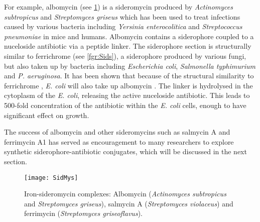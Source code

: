 For example, albomycin  (see \ref{fgr:SidMys}) is a sideromycin produced by \textit{Actinomyces subtropicus} and \textit{Streptomyces griseus}\cite{Hartmann1979,Fiedler1985} which has been used to treat infections caused by various bacteria including \textit{Yersinia enterocolitica} and \textit{Streptococcus pneumoniae} in mice and humans\cite{Gause1955,Pramanik2007}. 
Albomycin  contains a siderophore coupled to a nuceloside antibiotic via a peptide linker. 
The siderophore section is structurally similar to ferrichrome  (see \ref{fgr:Sids}), a siderophore produced by various fungi, but also taken up by bacteria including \textit{Escherichia coli}, \textit{Salmonella typhimurium} and \textit{P. aeruginosa}\cite{vanderHelm1980,Hannauer2010}.
It has been shown that because of the structural similarity to ferrichrome , \textit{E. coli} will also take up albomycin \cite{Hartmann1979}.
The linker is hydrolysed in the cytoplasm of the \textit{E. coli}, releasing the active nuceloside antibiotic. This leads to 500-fold concentration of the antibiotic within the \textit{E. coli} cells, enough to have significant effect on growth.

The success of albomycin\cite{Gause1955} and other sideromycins such as salmycin A\cite{Hider2010,Vertesy1995,Braun2009} and ferrimycin A1\cite{Sackmann1962,Gottlieb2012} has served as encouragement to many researchers to explore synthetic siderophore-antibiotic conjugates, which will be discussed in the next section. 


\begin{figure}[H]
	\begin{center}
		\texttt{[image: SidMys]}
		\caption{Iron-sideromycin complexes: Albomycin \cite{Benz1982,Hider2010} (\textit{Actinomyces subtropicus} and \textit{Streptomyces griseus}), salmycin A\cite{Hider2010,Vertesy1995,Braun2009} (\textit{Streptomyces violaceus}) and ferrimycin\cite{Hider2010} (\textit{Streptomyces griseoflavus}). \label{fgr:SidMys}}
	\end{center}
\end{figure}

